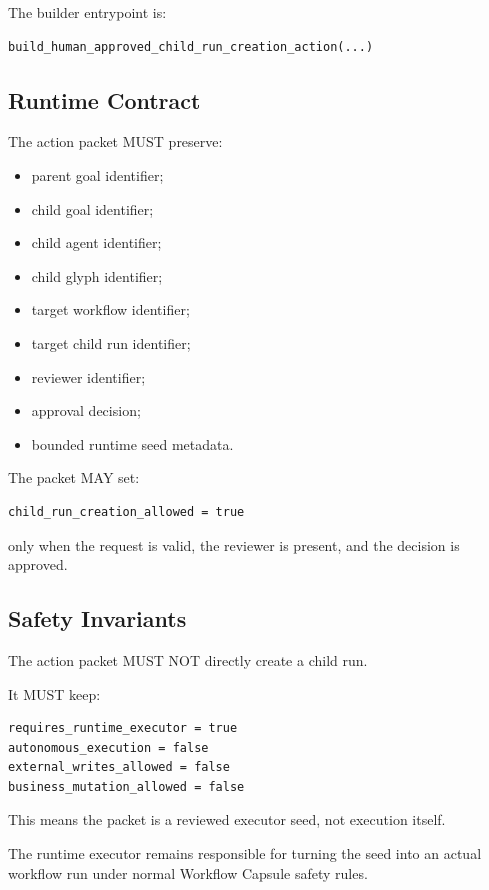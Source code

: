 The builder entrypoint is:

\begin{verbatim}
build_human_approved_child_run_creation_action(...)
\end{verbatim}

\subsection{Runtime Contract}

The action packet MUST preserve:

\begin{itemize}
  \item parent goal identifier;
  \item child goal identifier;
  \item child agent identifier;
  \item child glyph identifier;
  \item target workflow identifier;
  \item target child run identifier;
  \item reviewer identifier;
  \item approval decision;
  \item bounded runtime seed metadata.
\end{itemize}

The packet MAY set:

\begin{verbatim}
child_run_creation_allowed = true
\end{verbatim}

only when the request is valid, the reviewer is present, and the decision is approved.

\subsection{Safety Invariants}

The action packet MUST NOT directly create a child run.

It MUST keep:

\begin{verbatim}
requires_runtime_executor = true
autonomous_execution = false
external_writes_allowed = false
business_mutation_allowed = false
\end{verbatim}

This means the packet is a reviewed executor seed, not execution itself.

The runtime executor remains responsible for turning the seed into an actual workflow run under normal Workflow Capsule safety rules.

